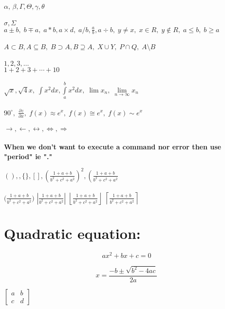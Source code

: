 \documentclass{article}
\begin{document}
	$\alpha,\,\beta,\Gamma,\Theta,\gamma,\theta $ \\\\
	
	$\sigma,\Sigma$ \\ $a \pm b, \; b \mp a, \; a*b, a \times d, \; a/b, \frac{a}{b}, a \div b, \; y \neq x, \; x \in R, \; y \notin R, \; a \leq b, \; b \geq a $ \\\\
	
	$ A \subset B, A \subseteq B, \; B \supset A, B \supseteq A, \; X \cup Y, \; P \cap Q, \; A \setminus B $ \\\\
	
	$ 1,2,3,\dots $ \\ $ 1+2+3+\cdots+10 $ \\\\
	
	$ \sqrt{x}, \sqrt{4}{x}, \; \int x^2 dx, \int\limits_{a}^{b} x^2 dx, \; \lim x_n, \; \lim\limits_{n \to \infty} x_n $\\\\
	
	$ 90^\circ, \; \frac{\partial z}{\partial x}, \; f(x) \approx e^x, \; f(x) \cong e^x, \; f(x) \sim e^x $\\\\
	
	$\rightarrow, \longleftarrow, \leftrightarrow, \Leftrightarrow, \Rightarrow$\\\\
	
	\textbf{When we don't want to execute a command nor error then use "period" ie "."}
	
	$ (), {}, \{\}, [], \left( \frac{1+a+b}{b^2+c^2+a^2} \right)^2,  \left( \frac{1+a+b}{b^2+c^2+a^2} \right.$\\\\
	
	$\big ( \frac{1+a+b}{b^2+c^2+a^2} )$
	$\left| \frac{1+a+b}{b^2+c^2+a^2} \right|$
	$\left \lfloor \frac{1+a+b}{b^2+c^2+a^2} \right \rfloor$
	$\left \lceil \frac{1+a+b}{b^2+c^2+a^2} \right \rceil$
	
	\section*{Quadratic equation:} \[ ax^2+bx+c=0 \]
	
	\[x= \frac{-b \pm \sqrt{b^2 - 4ac}}{2a}\]
	
	$\begin{bmatrix}
		a & b \\ c & d
	\end{bmatrix} $
	
	
	
\end{document}
